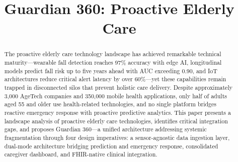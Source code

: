 \documentclass[conference]{IEEEtran}
\begin{document}
\title{Guardian 360: Proactive Elderly Care}

\author{
\and
{}
\and
{}
\and
{}
}

\maketitle

\begin{abstract}
The proactive elderly care technology landscape has achieved remarkable technical maturity---wearable fall detection reaches 97\% accuracy with edge AI, longitudinal models predict fall risk up to five years ahead with AUC exceeding 0.90, and IoT architectures reduce critical alert latency by over 60\%---yet these capabilities remain trapped in disconnected silos that prevent holistic care delivery. Despite approximately 3,000 AgeTech companies and 350,000 mobile health applications, only half of adults aged 55 and older use health-related technologies, and no single platform bridges reactive emergency response with proactive predictive analytics. This paper presents a landscape analysis of proactive elderly care technologies, identifies critical integration gaps, and proposes Guardian 360---a unified architecture addressing systemic fragmentation through four design imperatives: a sensor-agnostic data ingestion layer, dual-mode architecture bridging prediction and emergency response, consolidated caregiver dashboard, and FHIR-native clinical integration.
\end{abstract}
\end{document}
